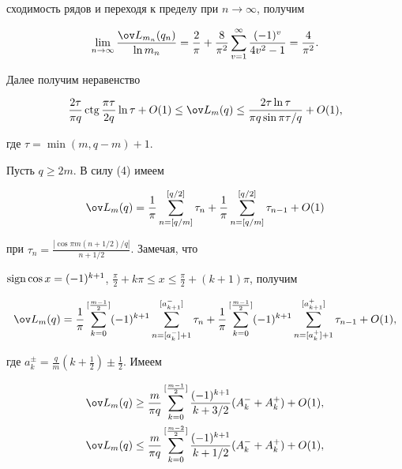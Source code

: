 сходимость рядов и переходя к пределу при $n\to\infty$, получим 


$$ 


\lim_{n\to\infty}\frac{\ov L_{m_n}(q_n)}{\ln m_n}=\frac{2}{\pi}+ 


\frac{8}{\pi^2}\sum^\infty_{v=1}\frac{(-1)^v}{4v^2-1}=\frac{4}{\pi^2}. 


$$ 


Далее получим неравенство 


\begin{equation} 


\frac{2\tau}{\pi q}\ctg\frac{\pi\tau}{2q}\ln\tau+O(1)\le\ov L_m(q) 


\le\frac{2\tau\ln\tau}{\pi q\sin\pi\tau/q}+O(1), 


\end{equation} 


где $\tau=\min(m,q-m)+1$. 


 


Пусть $q\ge2m$. В силу (4) имеем 


$$ 


\ov L_m(q)=\frac{1}{\pi}\sum^{[q/2]}_{n=[q/m]}\tau_n+ 


\frac{1}{\pi}\sum^{[q/2]}_{n=[q/m]}\tau_{n-1}+O(1) 


$$ 


при $\tau_n=\frac{|\cos\pi m(n+1/2)/q|}{n+1/2}$. Замечая, что 


$\sign\cos x=(-1)^{k+1}$, $\frac{\pi}{2}+k\pi\le 


x\le\frac{\pi}{2}+(k+1)\pi$, получим 


$$ 


\ov L_m(q)=\frac{1}{\pi}\sum^{[\frac{m-1}{2}]}_{k=0}(-1)^{k+1} 


\sum^{[a^-_{k+1}]}_{n=[a^-_k]+1}\tau_n+\frac{1}{\pi} 


\sum^{[\frac{m-1}{2}]}_{k=0}(-1)^{k+1} 


\sum^{[a^+_{k+1}]}_{n=[a^+_k]+1}\tau_{n-1}+O(1), 


$$ 


где $a^\pm_k=\frac{q}{m}(k+\frac{1}{2})\pm\frac{1}{2}$. Имеем 


\begin{align*} 


\ov L_m(q)&\ge\frac{m}{\pi q}\sum^{[\frac{m-1}{2}]}_{k=0} 


\frac{(-1)^{k+1}}{k+3/2}(A^-_k+A^+_k)+O(1),\\ 


% 


\ov L_m(q)&\le\frac{m}{\pi q}\sum^{[\frac{m-2}{2}]}_{k=0} 


\frac{(-1)^{k+1}}{k+1/2}(A^-_k+A^+_k)+O(1),


\end{align*} 


